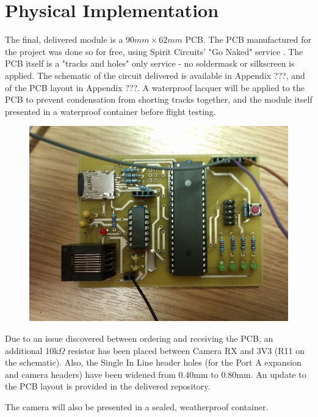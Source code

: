 \section{Physical Implementation}
\label{sec:PCB-implementation}

The final, delivered module is a $90mm\times62mm$ PCB. The PCB manufactured 
for the project was done so for free, using Spirit Circuits' "Go Naked"
service \cite{go-naked}. The PCB itself is a "tracks and holes" only service 
- no soldermask or silkscreen is applied. The schematic of the circuit 
delivered is available in Appendix ???, and of the PCB layout in Appendix 
???. A waterproof lacquer will be applied to the PCB to prevent condensation 
from shorting tracks together, and the module itself presented in a 
waterproof container before flight testing.

\begin{figure}[H]
        \centering
        \includegraphics[width=1.00\textwidth]{figures/PayloadImplementation.jpg}
        \label{fig:PayloadImplementation}
\end{figure}

Due to an issue discovered between ordering and receiving the PCB, an 
additional 10k$\Omega$ resistor has been placed between Camera RX and 3V3 (R11 
on the schematic). Also, the Single In Line header holes (for the Port A 
expansion and camera headers) have been widened from 0.40mm to 0.80mm. An 
update to the PCB layout is provided in the delivered repository.

The camera will also be presented in a sealed, weatherproof container.